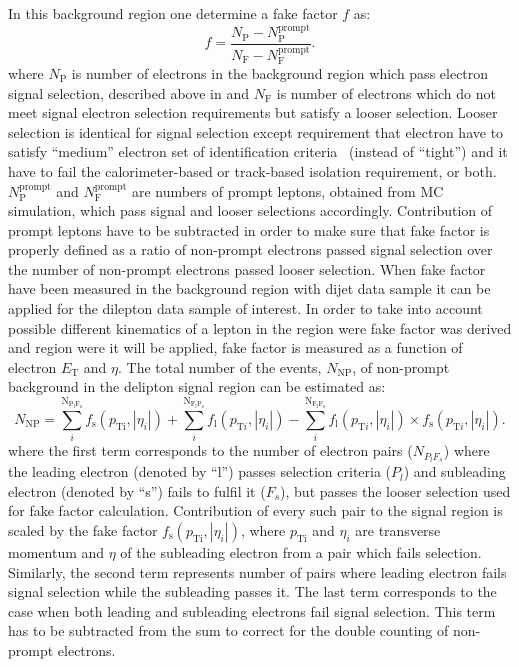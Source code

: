 In this background region one determine a fake factor $f$ as:
\begin{equation}
f = \frac{N_{\mathrm{P}} - N_{\mathrm{P}}^{\mathrm{prompt}}}{N_{\mathrm{F}}  - N_{\mathrm{F}}^{\mathrm{prompt}}}.
\label{eq:fakefactor}
\end{equation}
where $N_{\mathrm{P}}$ is number of electrons in the background region which pass electron signal selection,
described above in  and $N_{\mathrm{F}}$ is number of electrons which do not meet 
signal electron selection requirements but satisfy a looser selection. Looser selection is identical for signal selection except 
requirement that electron have to satisfy ``medium'' electron set of identification criteria~\cite{electron_tight} (instead of ``tight'') 
and it have to fail the calorimeter-based or track-based isolation requirement, or both.
$N_{\mathrm{P}}^{\mathrm{prompt}}$ and $N_{\mathrm{F}}^{\mathrm{prompt}}$ are numbers of prompt
leptons, obtained from MC simulation, which pass signal and looser selections accordingly.
Contribution of prompt leptons have to be subtracted in order to make sure that 
fake factor is properly defined as a ratio of non-prompt electrons passed signal selection over 
the number of non-prompt electrons passed looser selection.
When fake factor have been measured in the background region with dijet data sample it can be applied for the dilepton data sample of interest.
In order to take into account possible different kinematics of a lepton in the region were fake factor was derived 
and region were it will be applied, fake factor is measured as a function of electron $E_\mathrm{T}$ and $\eta$.
The total number of the events, $N_{\mathrm{NP}}$, of non-prompt background in the delipton signal region can be estimated as:
\begin{equation}
N_{\mathrm{NP}} = \sum_{i}^{\mathrm{N_{P_l F_s}}} f_{\mathrm{s}}(p_{\mathrm{Ti}},|\eta_{i}|) + \sum_{i}^{\mathrm{N_{F_l P_s}}} f_{\mathrm{l}}(p_{\mathrm{T}i},|\eta_{i}|) - \sum_{i}^{\mathrm{N_{F_l F_s}}} f_{\mathrm{l}}(p_{\mathrm{T}i},|\eta_{i}|) \times f_{\mathrm{s}}(p_{\mathrm{T}i},|\eta_{i}|).
\label{eq:fake_pred}
\end{equation}
where the first term corresponds to the number of electron pairs ($N_{P_l F_s}$) 
where the leading electron (denoted by ``l'') passes selection criteria ($P_l$) and subleading electron 
(denoted by ``s'')
fails to fulfil it ($F_s$), but passes the looser selection used for fake factor calculation. 
Contribution of every such pair to the signal region is scaled by the fake factor 
$f_{\mathrm{s}}(p_{\mathrm{Ti}},|\eta_{i}|)$, where $p_\mathrm{Ti}$ and $\eta_{i}$ are transverse momentum and $\eta$
of the subleading electron from a pair which fails selection. 
Similarly, the second term represents number of pairs where
leading electron fails signal selection while the subleading passes it. 
The last term corresponds to the case when both leading
and subleading electrons fail signal selection. This term has to be subtracted from the sum to correct for the double
counting of non-prompt electrons.

